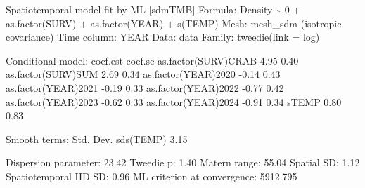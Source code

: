 \documentclass[
  letterpaper,
  DIV=11,
  numbers=noendperiod]{scrreprt}
\newenvironment{Shaded}{\begin{snugshade}}{\end{snugshade}}
\newcommand{\AttributeTok}[1]{\textcolor[rgb]{0.40,0.45,0.13}{#1}}
\newcommand{\DecValTok}[1]{\textcolor[rgb]{0.68,0.00,0.00}{#1}}
\newcommand{\FloatTok}[1]{\textcolor[rgb]{0.68,0.00,0.00}{#1}}
\newcommand{\FunctionTok}[1]{\textcolor[rgb]{0.28,0.35,0.67}{#1}}
\newcommand{\NormalTok}[1]{\textcolor[rgb]{0.00,0.23,0.31}{#1}}
\newcommand{\SpecialCharTok}[1]{\textcolor[rgb]{0.37,0.37,0.37}{#1}}
\newcommand{\StringTok}[1]{\textcolor[rgb]{0.13,0.47,0.30}{#1}}
\begin{document}
\begin{Shaded}
\begin{Highlighting}[]
\NormalTok{Spatiotemporal model fit by ML [}\StringTok{\textquotesingle{}sdmTMB\textquotesingle{}}\NormalTok{]}
\NormalTok{Formula}\SpecialCharTok{:}\NormalTok{ Density }\SpecialCharTok{\textasciitilde{}} \DecValTok{0} \SpecialCharTok{+} \FunctionTok{as.factor}\NormalTok{(SURV) }\SpecialCharTok{+} \FunctionTok{as.factor}\NormalTok{(YEAR) }\SpecialCharTok{+} \FunctionTok{s}\NormalTok{(TEMP)}
\NormalTok{Mesh}\SpecialCharTok{:} \FunctionTok{mesh\_sdm}\NormalTok{ (isotropic covariance)}
\NormalTok{Time column}\SpecialCharTok{:}\NormalTok{ YEAR}
\NormalTok{Data}\SpecialCharTok{:}\NormalTok{ data}
\NormalTok{Family}\SpecialCharTok{:} \FunctionTok{tweedie}\NormalTok{(}\AttributeTok{link =} \StringTok{\textquotesingle{}log\textquotesingle{}}\NormalTok{)}
 
\NormalTok{Conditional model}\SpecialCharTok{:}
\NormalTok{                    coef.est coef.se}
\FunctionTok{as.factor}\NormalTok{(SURV)CRAB     }\FloatTok{4.95}    \FloatTok{0.40}
\FunctionTok{as.factor}\NormalTok{(SURV)SUM      }\FloatTok{2.69}    \FloatTok{0.34}
\FunctionTok{as.factor}\NormalTok{(YEAR)}\DecValTok{2020}    \SpecialCharTok{{-}}\FloatTok{0.14}    \FloatTok{0.43}
\FunctionTok{as.factor}\NormalTok{(YEAR)}\DecValTok{2021}    \SpecialCharTok{{-}}\FloatTok{0.19}    \FloatTok{0.33}
\FunctionTok{as.factor}\NormalTok{(YEAR)}\DecValTok{2022}    \SpecialCharTok{{-}}\FloatTok{0.77}    \FloatTok{0.42}
\FunctionTok{as.factor}\NormalTok{(YEAR)}\DecValTok{2023}    \SpecialCharTok{{-}}\FloatTok{0.62}    \FloatTok{0.33}
\FunctionTok{as.factor}\NormalTok{(YEAR)}\DecValTok{2024}    \SpecialCharTok{{-}}\FloatTok{0.91}    \FloatTok{0.34}
\NormalTok{sTEMP                   }\FloatTok{0.80}    \FloatTok{0.83}

\NormalTok{Smooth terms}\SpecialCharTok{:}
\NormalTok{          Std. Dev.}
\FunctionTok{sds}\NormalTok{(TEMP)      }\FloatTok{3.15}

\NormalTok{Dispersion parameter}\SpecialCharTok{:} \FloatTok{23.42}
\NormalTok{Tweedie p}\SpecialCharTok{:} \FloatTok{1.40}
\NormalTok{Matern range}\SpecialCharTok{:} \FloatTok{55.04}
\NormalTok{Spatial SD}\SpecialCharTok{:} \FloatTok{1.12}
\NormalTok{Spatiotemporal IID SD}\SpecialCharTok{:} \FloatTok{0.96}
\NormalTok{ML criterion at convergence}\SpecialCharTok{:} \FloatTok{5912.795}


\end{Highlighting}
\end{Shaded}
\end{document}

